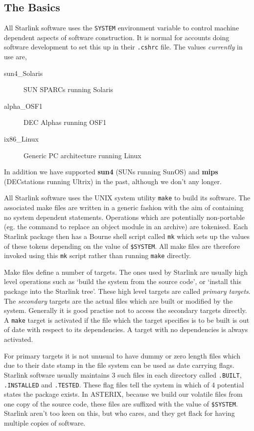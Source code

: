 \subsection{The Basics}

All Starlink software uses the \verb+SYSTEM+ environment variable
to control machine dependent aspects of software construction. It
is normal for accounts doing software development to set this up
in their \verb+.cshrc+ file. The values {\em currently} in use
are,
\begin{description}
\item[sun4\_Solaris] SUN SPARCs running Solaris
\item[alpha\_OSF1] DEC Alphas running OSF1
\item[ix86\_Linux] Generic PC architecture running Linux
\end{description}
In addition we have supported {\bf sun4} (SUNs running SunOS) and
{\bf mips} (DECstations running Ultrix) in the past, although we
don't any longer.

All Starlink software uses the UNIX system utility \verb+make+ to build
its software. The associated make files are written in a generic fashion
with the aim of containing no system dependent statements. Operations
which are potentially non-portable (eg. the command to replace an object
module in an archive) are tokenised. Each Starlink package then has a
Bourne shell script called \verb+mk+ which sets up the values of these
tokens depending on the value of \verb+$SYSTEM+. All make files are 
therefore invoked using this \verb+mk+ script rather than running
\verb+make+ directly.

Make files define a number of targets. The ones used by Starlink
are usually high level operations such as `build the system from the
source code', or `install this package into the Starlink tree'. These
high level targets are called {\em primary targets}. The {\em secondary}
targets are the actual files which are built or modified by the system.
Generally it is good practise not to access the secondary targets directly.
A \verb+make+ target is activated if the file which the target specifies 
is to be built is out of date with respect to its dependencies. A target
with no dependencies is always activated.

For primary targets it is not unusual to have dummy or zero length
files which due to their date stamp in the file system can be used
as date carrying flags. Starlink software usually maintains 3 such files
in each directory called \verb+.BUILT+, \verb+.INSTALLED+ and \verb+.TESTED+.
These flag files tell the system in which of 4 potential states the package
exists. In ASTERIX, because we build our volatile files from one copy of
the source code, these files are suffixed with the value of \verb+$SYSTEM+.
Starlink aren't too keen on this, but who cares, and they get flack for
having multiple copies of software.

